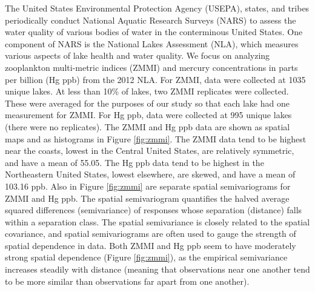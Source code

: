 \documentclass[]{elsarticle} %
\begin{document}
The United States Environmental Protection Agency (USEPA), states, and
tribes periodically conduct National Aquatic Research Surveys (NARS) to
assess the water quality of various bodies of water in the conterminous
United States. One component of NARS is the National Lakes Assessment
(NLA), which measures various aspects of lake health and water quality.
We focus on analyzing zooplankton multi-metric indices (ZMMI) and
mercury concentrations in parts per billion (Hg ppb) from the 2012 NLA.
For ZMMI, data were collected at 1035 unique lakes. At less than 10\% of
lakes, two ZMMI replicates were collected. These were averaged for the
purposes of our study so that each lake had one measurement for ZMMI.
For Hg ppb, data were collected at 995 unique lakes (there were no
replicates). The ZMMI and Hg ppb data are shown as spatial maps and as
histograms in Figure \ref{fig:zmmi}. The ZMMI data tend to be highest
near the coasts, lowest in the Central United States, are relatively
symmetric, and have a mean of 55.05. The Hg ppb data tend to be highest
in the Northeastern United States, lowest elsewhere, are skewed, and
have a mean of 103.16 ppb. Also in Figure \ref{fig:zmmi} are separate
spatial semivariograms for ZMMI and Hg ppb. The spatial semivariogram
quantifies the halved average squared differences (semivariance) of
responses whose separation (distance) falls within a separation class.
The spatial semivariance is closely related to the spatial covariance,
and spatial semivariograms are often used to gauge the strength of
spatial dependence in data. Both ZMMI and Hg ppb seem to have moderately
strong spatial dependence (Figure \ref{fig:zmmi}), as the empirical
semivariance increases steadily with distance (meaning that observations
near one another tend to be more similar than observations far apart
from one another).
\end{document}
